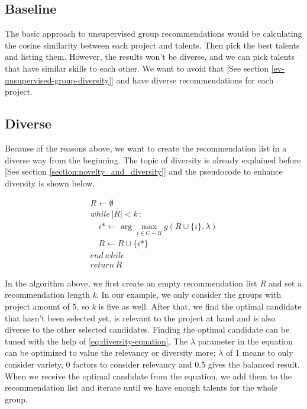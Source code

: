 \subsection{Baseline}

The basic approach to unsupervised group recommendations would be calculating the cosine similarity between each project and talents. Then pick the best talents and listing them. However, the results won't be diverse, and we can pick talents that have similar skills to each other. We want to avoid that [See section \ref{ev-unsupervised-group-diversity}] and have diverse recommendations for each project.


\subsection{Diverse}\label{implementation-diverse}

Because of the reasons above, we want to create the recommendation list in a diverse way from the beginning. The topic of diversity is already explained before [See section \ref{section:novelty_and_diversity}] and the pseudocode to enhance diversity is shown below.

\begin{equation}
\begin{array} { l } { R \leftarrow \emptyset } \\ {  while\, | R | < k\,: } \\ { \quad i * \leftarrow \arg \max _ { i \in C - R } g ( R \cup \{ i \} , \lambda ) } \\ { \quad R \leftarrow R \cup \{ i * \} } \\ { end\, while\,  } \\ {  return\,  R } \end{array}
\label{eq:diversity-enhancement}
\end{equation}


In the algorithm above, we first create an empty recommendation list \textit{R} and set a recommendation length \textit{k}. In our example, we only consider the groups with project amount of 5, so \textit{k} is five as well. After that, we find the optimal candidate that hasn't been selected yet, is relevant to the project at hand and is also diverse to the other selected candidates. Finding the optimal candidate can be tuned with the help of \autoref{eq:diversity-equation}. The $\lambda$ parameter in the equation can be optimized to value the relevancy or diversity more; $\lambda$ of 1 means to only consider variety, 0 factors to consider relevancy and 0.5 gives the balanced result. When we receive the optimal candidate from the equation, we add them to the recommendation list and iterate until we have enough talents for the whole group.


